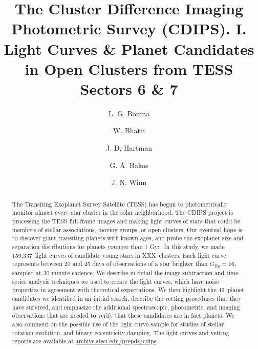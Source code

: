 \documentclass[12pt,twocolumn,tighten]{aastex62}
\newcommand{\numberpcs}{42\ }
\newcommand{\numberlcs}{159{,}337\ } %
\newcommand{\numberclusters}{XXX\ }
\newcommand{\stscilink} {\url{archive.stsci.edu/prepds/cdips}}
\begin{document}
\title{
  The Cluster Difference Imaging Photometric Survey (CDIPS).  I.
  Light Curves \& Planet Candidates in Open Clusters from TESS Sectors 6 \& 7
}


\author[0000-0002-0514-5538]{L. G. Bouma}
%
\author[0000-0002-0628-0088]{W. Bhatti}
%
\author[0000-0001-8732-6166]{J. D. Hartman}
%
\author[0000-0001-7204-6727]{G. \'A. Bakos}
%
\author[0000-0002-4265-047X]{J. N. Winn}

\begin{abstract}
  The Transiting Exoplanet Survey Satellite (TESS) has begun to
  photometrically monitor almost every star cluster in
  the solar neighborhood.
  The CDIPS project is processing the TESS
  full-frame images and making light curves of stars that could be
  members of stellar associations, moving groups, or open clusters.
  Our eventual hope is to discover giant transiting planets with known
  ages, and probe the exoplanet size and separation distributions for
  planets younger than 1 Gyr.
  In this study, we made \numberlcs light curves of candidate young
  stars in \numberclusters clusters.
  Each light curve represents between 20 and 25 days of observations
  of a star brighter than $G_{Rp}=16$, sampled at 30 minute cadence.
  We describe in detail the image subtraction and time-series analysis 
  techniques we used to create the light curves, which
  have noise properties in agreement with theoretical expectations.
  We then highlight the \numberpcs planet candidates we identified in
  an initial search, describe the vetting procedures that they have
  survived, and emphasize the additional spectroscopic, photometric,
  and imaging observations that are needed to verify that these
  candidates are in fact planets.
  We also comment on the possible use of the light curve sample for
  studies of stellar rotation evolution, and binary eccentricity
  damping.
  The light curves and vetting reports are available at
  \stscilink.
\end{abstract}
\end{document}
